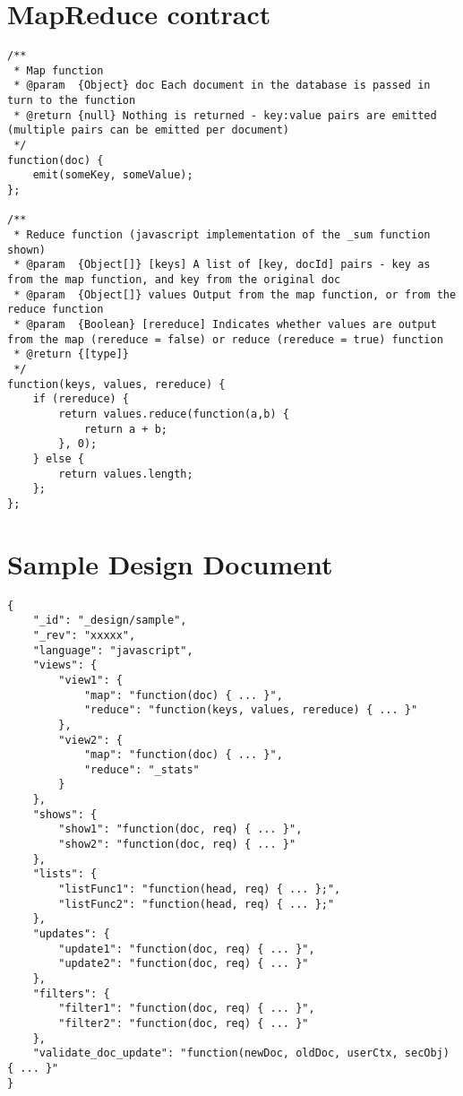 \section{MapReduce contract}
\label{couchdb-mapreduce-contracts}
\begin{verbatim}
/**
 * Map function
 * @param  {Object} doc Each document in the database is passed in turn to the function
 * @return {null} Nothing is returned - key:value pairs are emitted (multiple pairs can be emitted per document)
 */
function(doc) {
    emit(someKey, someValue);
};

/**
 * Reduce function (javascript implementation of the _sum function shown)
 * @param  {Object[]} [keys] A list of [key, docId] pairs - key as from the map function, and key from the original doc
 * @param  {Object[]} values Output from the map function, or from the reduce function
 * @param  {Boolean} [rereduce] Indicates whether values are output from the map (rereduce = false) or reduce (rereduce = true) function
 * @return {[type]}
 */
function(keys, values, rereduce) {
    if (rereduce) {
        return values.reduce(function(a,b) {
            return a + b;
        }, 0);
    } else {
        return values.length;
    };
};
\end{verbatim}

\section{Sample Design Document}
\label{couchdb-design-doc-sample}
\begin{verbatim}
{
    "_id": "_design/sample",
    "_rev": "xxxxx",
    "language": "javascript",
    "views": {
        "view1": {
            "map": "function(doc) { ... }",
            "reduce": "function(keys, values, rereduce) { ... }"
        },
        "view2": {
            "map": "function(doc) { ... }",
            "reduce": "_stats"            
        }
    },
    "shows": {
        "show1": "function(doc, req) { ... }",
        "show2": "function(doc, req) { ... }"
    },
    "lists": {
        "listFunc1": "function(head, req) { ... };",
        "listFunc2": "function(head, req) { ... };"
    },
    "updates": {
        "update1": "function(doc, req) { ... }",
        "update2": "function(doc, req) { ... }"
    },
    "filters": {
        "filter1": "function(doc, req) { ... }",
        "filter2": "function(doc, req) { ... }"
    },
    "validate_doc_update": "function(newDoc, oldDoc, userCtx, secObj) { ... }"
}
\end{verbatim}

